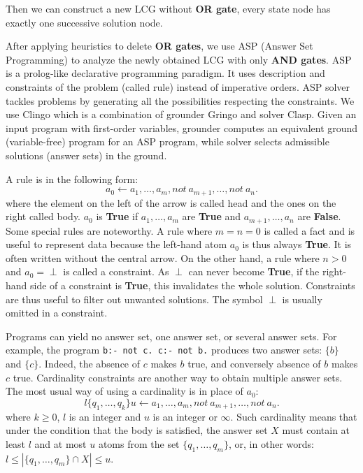\documentclass{entcs}
\begin{document}
Then we can construct a new LCG without \textbf{OR gate}, every state node has exactly one successive solution node.
%    

After applying heuristics to delete \textbf{OR gates}, we use ASP  (Answer Set Programming) \cite{baral2003knowledge} to analyze the newly obtained LCG with only \textbf{AND gates}.
ASP is a prolog-like declarative programming paradigm.
It uses description and constraints of the problem (called rule) instead of imperative orders.
ASP solver tackles problems by generating all the possibilities respecting the constraints. 
We use Clingo\cite{gebser2016theory} which is a combination of grounder Gringo and solver Clasp. 
Given an input program with first-order variables, grounder computes an equivalent ground (variable-free) program for an ASP program, while solver selects admissible solutions (answer sets) in the ground.

A rule is in the following form:
$$a_0 \gets a_1 , \ldots , a_m, not\ a_{m+1}, \ldots , not\ a_n.$$
where the element on the left of the arrow is called head and the ones on the right called body.
$a_0$ is \textbf{True} if $a_1 , \ldots , a_m$ are \textbf{True} and $a_{m+1}, \ldots , a_n$ are \textbf{False}.
Some special rules are noteworthy. 
A rule where $m = n = 0$ is called a fact and is useful to represent data because the left-hand atom $a_0$ is thus always \textbf{True}.
It is often written without the central arrow.
On the other hand, a rule where $n > 0$ and $a_0 = \perp$ is called a constraint.
As $\perp$ can never become \textbf{True}, if the right-hand side of a constraint is \textbf{True}, this invalidates the whole solution.
Constraints are thus useful to filter out unwanted solutions.
The symbol $\perp$ is usually omitted in a constraint.

Programs can yield no answer set, one answer set, or several answer sets. 
For example, the program \texttt{b:- not c. c:- not b.}  produces two answer sets: $\{b\}$ and $\{c\}$.
Indeed, the absence of $c$ makes $b$ true, and conversely absence of $b$ makes $c$ true. 
Cardinality constraints are another way to obtain multiple answer sets. 
The most usual way of using a cardinality is in place of $a_0$:
$$l \{q_1, \ldots , q_k \} u \gets a_1, \ldots , a_m, not\ a_{m+1}, \ldots , not\ a_n.$$
where $k \geq 0$, $l$ is an integer and $u$ is an integer or $\infty$. 
Such cardinality means that under the condition that the body is satisfied, the answer set $X$ must contain at least $l$ and at most $u$ atoms from the set $\{q_1, \ldots  , q_m\}$, or, in other words: $l \leq |\{q_1, \ldots  , q_m\} \cap X| \leq u$. %
\end{document}
